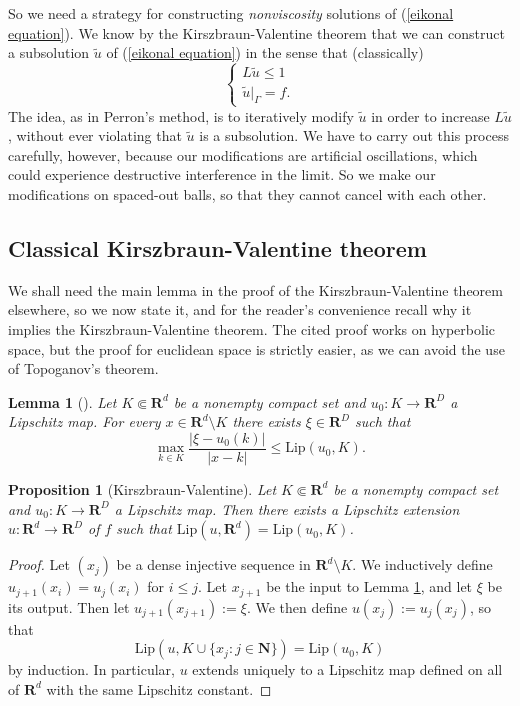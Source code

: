 \documentclass[reqno,11pt]{amsart}
\newcommand{\NN}{\mathbf{N}}
\newcommand{\RR}{\mathbf{R}}
\newcommand{\Lip}{\mathrm{Lip}}
\newtheorem{lemma}[theorem]{Lemma}
\newtheorem{proposition}[theorem]{Proposition}
\theoremstyle{definition}
\numberwithin{equation}{section}
\begin{document}
So we need a strategy for constructing \emph{nonviscosity} solutions of (\ref{eikonal equation}).
We know by the Kirszbraun-Valentine theorem that we can construct a subsolution $\tilde u$ of (\ref{eikonal equation}) in the sense that (classically)
$$\begin{cases}
L\tilde u \leq 1 \\
\tilde u|_\Gamma = f.
\end{cases}$$
The idea, as in Perron's method, is to iteratively modify $\tilde u$ in order to increase $L \tilde u$, without ever violating that $\tilde u$ is a subsolution.
We have to carry out this process carefully, however, because our modifications are artificial oscillations, which could experience destructive interference in the limit.
So we make our modifications on spaced-out balls, so that they cannot cancel with each other.

\subsection{Classical Kirszbraun-Valentine theorem}
We shall need the main lemma in the proof of the Kirszbraun-Valentine theorem elsewhere, so we now state it, and for the reader's convenience recall why it implies the Kirszbraun-Valentine theorem.
The cited proof works on hyperbolic space, but the proof for euclidean space is strictly easier, as we can avoid the use of Topoganov's theorem.

\begin{lemma}[{\cite[\S1.3]{Kassel17}}]\label{KV lemma}
Let $K \Subset \RR^d$ be a nonempty compact set and $u_0: K \to \RR^D$ a Lipschitz map.
For every $x \in \RR^d \setminus K$ there exists $\xi \in \RR^D$ such that 
$$\max_{k \in K} \frac{|\xi - u_0(k)|}{|x - k|} \leq \Lip(u_0, K).$$
\end{lemma}

\begin{proposition}[Kirszbraun-Valentine]
Let $K \Subset \RR^d$ be a nonempty compact set and $u_0: K \to \RR^D$ a Lipschitz map.
Then there exists a Lipschitz extension $u: \RR^d \to \RR^D$ of $f$ such that $\Lip(u, \RR^d) = \Lip(u_0, K)$.
\end{proposition}
\begin{proof}
Let $(x_j)$ be a dense injective sequence in $\RR^d \setminus K$.
We inductively define $u_{j + 1}(x_i) = u_j(x_i)$ for $i \leq j$.
Let $x_{j + 1}$ be the input to Lemma \ref{KV lemma}, and let $\xi$ be its output.
Then let $u_{j + 1}(x_{j + 1}) := \xi$.
We then define $u(x_j) := u_j(x_j)$, so that
$$\Lip(u, K \cup \{x_j: j \in \NN\}) = \Lip(u_0, K)$$
by induction.
In particular, $u$ extends uniquely to a Lipschitz map defined on all of $\RR^d$ with the same Lipschitz constant.
\end{proof}
\end{document}
